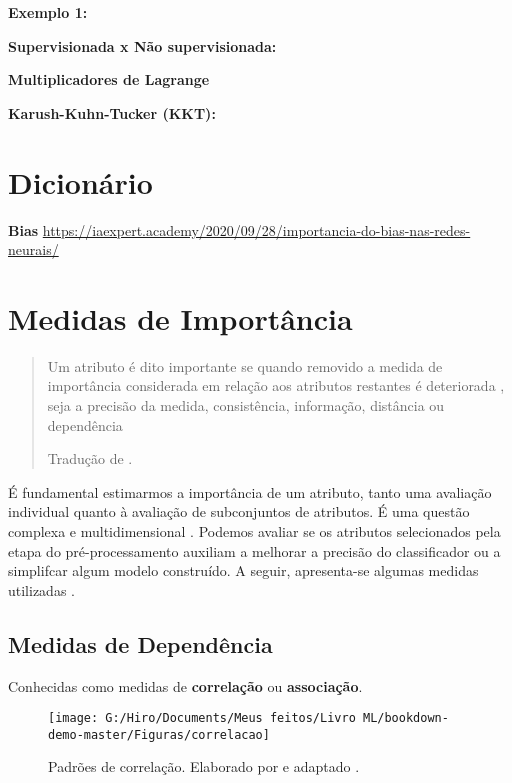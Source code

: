 \documentclass[
  openany]{book}
\begin{document}
\textbf{Exemplo 1:}

\textbf{Supervisionada x Não supervisionada:}

\textbf{Multiplicadores de Lagrange}

\textbf{Karush-Kuhn-Tucker (KKT):}

\hypertarget{dicionuxe1rio}{%
\section{Dicionário}\label{dicionuxe1rio}}

\textbf{Bias}
\url{https://iaexpert.academy/2020/09/28/importancia-do-bias-nas-redes-neurais/}

\hypertarget{medidasimport}{%
\section{Medidas de Importância}\label{medidasimport}}

\begin{quote}
Um atributo é dito importante se quando removido a medida de importância considerada em relação aos atributos restantes é deteriorada , seja a precisão da medida, consistência, informação, distância ou dependência

Tradução de \citet{liu2012feature}.
\end{quote}

É fundamental estimarmos a importância de um atributo, tanto uma avaliação individual quanto à avaliação de subconjuntos de atributos. É uma questão complexa e multidimensional \citep{liu2012feature}. Podemos avaliar se os atributos selecionados pela etapa do pré-processamento auxiliam a melhorar a precisão do classificador ou a simplifcar algum modelo construído. A seguir, apresenta-se algumas medidas utilizadas \citep{lee2005seleccao}.

\hypertarget{medidasdep}{%
\subsection{Medidas de Dependência}\label{medidasdep}}

Conhecidas como medidas de \textbf{correlação} ou \textbf{associação}.

\begin{figure}

{\centering \texttt{[image: G:/Hiro/Documents/Meus feitos/Livro ML/bookdown-demo-master/Figuras/correlacao]} 

}

\caption{Padrões de correlação. Elaborado por \citet{gujarati2011econometria} e adaptado \citet{theil1978}.}\label{fig:correlacao}
\end{figure}
\end{document}
